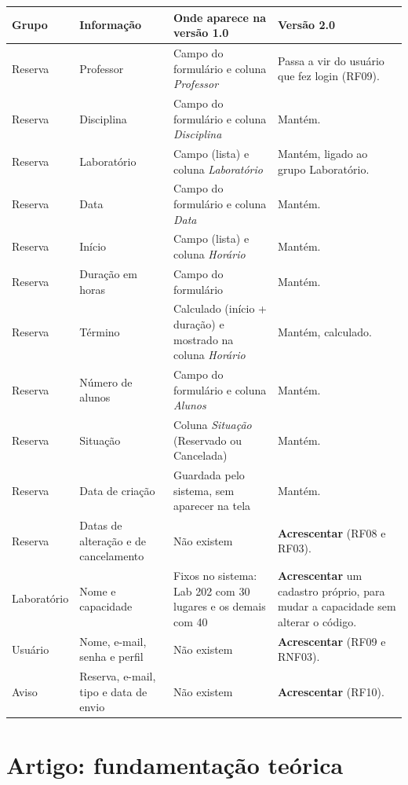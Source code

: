 \documentclass[a4paper,12pt]{article}
\begin{document}
\begin{xltabular}{\linewidth}{|l|>{\raggedright\arraybackslash}p{3.4cm}|Y|Y|}
  \hline
  \textbf{Grupo} & \textbf{Informação} & \textbf{Onde aparece na versão 1.0} & \textbf{Versão 2.0} \\ \hline
  \endhead
  Reserva & Professor & Campo do formulário e coluna \emph{Professor} & Passa a vir do usuário que fez login (RF09). \\ \hline
  Reserva & Disciplina & Campo do formulário e coluna \emph{Disciplina} & Mantém. \\ \hline
  Reserva & Laboratório & Campo (lista) e coluna \emph{Laboratório} & Mantém, ligado ao grupo Laboratório. \\ \hline
  Reserva & Data & Campo do formulário e coluna \emph{Data} & Mantém. \\ \hline
  Reserva & Início & Campo (lista) e coluna \emph{Horário} & Mantém. \\ \hline
  Reserva & Duração em horas & Campo do formulário & Mantém. \\ \hline
  Reserva & Término & Calculado (início + duração) e mostrado na coluna \emph{Horário} & Mantém, calculado. \\ \hline
  Reserva & Número de alunos & Campo do formulário e coluna \emph{Alunos} & Mantém. \\ \hline
  Reserva & Situação & Coluna \emph{Situação} (Reservado ou Cancelada) & Mantém. \\ \hline
  Reserva & Data de criação & Guardada pelo sistema, sem aparecer na tela & Mantém. \\ \hline
  Reserva & Datas de alteração e de cancelamento & Não existem & \textbf{Acrescentar} (RF08 e RF03). \\ \hline
  Laboratório & Nome e capacidade & Fixos no sistema: Lab 202 com 30 lugares e os demais com 40 & \textbf{Acrescentar} um cadastro próprio, para mudar a capacidade sem alterar o código. \\ \hline
  Usuário & Nome, e-mail, senha e perfil & Não existem & \textbf{Acrescentar} (RF09 e RNF03). \\ \hline
  Aviso & Reserva, e-mail, tipo e data de envio & Não existem & \textbf{Acrescentar} (RF10). \\ \hline
\end{xltabular}

\section{Artigo: fundamentação teórica}
\end{document}
